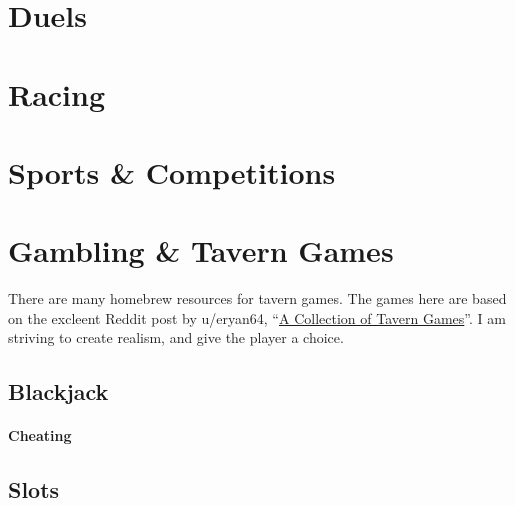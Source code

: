 \documentclass[twocolumn]{dndbook}
\begin{document}
\section{Duels}
\section{Racing}
\section{Sports \& Competitions}



\section{Gambling \& Tavern Games}

There are many homebrew resources for tavern games.
The games here are based on the excleent Reddit post by u/eryan64, ``\href{https://www.reddit.com/r/DnDBehindTheScreen/comments/fn6tng/a_collection_of_tavern_games/}{A Collection of Tavern Games}''.
I am striving to create realism, and give the player a choice.

\subsection{Blackjack}

\paragraph{Cheating}
\subsection{Slots}
\end{document}
